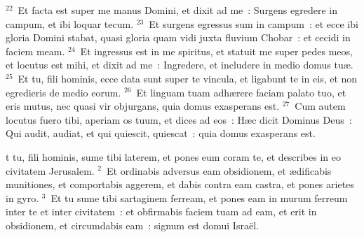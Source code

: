 ${}^{22}$~Et facta est super me manus Domini, et dixit ad me~: Surgens egredere in campum, et ibi loquar tecum.
${}^{23}$~Et surgens egressus sum in campum~: et ecce ibi gloria Domini stabat, quasi gloria quam vidi juxta fluvium Chobar~: et cecidi in faciem meam.
${}^{24}$~Et ingressus est in me spiritus, et statuit me super pedes meos, et locutus est mihi, et dixit ad me~: Ingredere, et includere in medio domus tu\ae .
${}^{25}$~Et tu, fili hominis, ecce data sunt super te vincula, et ligabunt te in eis, et non egredieris de medio eorum.
${}^{26}$~Et linguam tuam adh\ae rere faciam palato tuo, et eris mutus, nec quasi vir objurgans, quia domus exasperans est.
${}^{27}$~Cum autem locutus fuero tibi, aperiam os tuum, et dices ad eos~: H\ae c dicit Dominus Deus~: Qui audit, audiat, et qui quiescit, quiescat~: quia domus exasperans est.

\bchapter
{}t tu, fili hominis, sume tibi laterem, et pones eum coram te, et describes in eo civitatem Jerusalem.
${}^{2}$~Et ordinabis adversus eam obsidionem, et \ae dificabis munitiones, et comportabis aggerem, et dabis contra eam castra, et pones arietes in gyro.
${}^{3}$~Et tu sume tibi sartaginem ferream, et pones eam in murum ferreum inter te et inter civitatem~: et obfirmabis faciem tuam ad eam, et erit in obsidionem, et circumdabis eam~: signum est domui Isra\"el.


